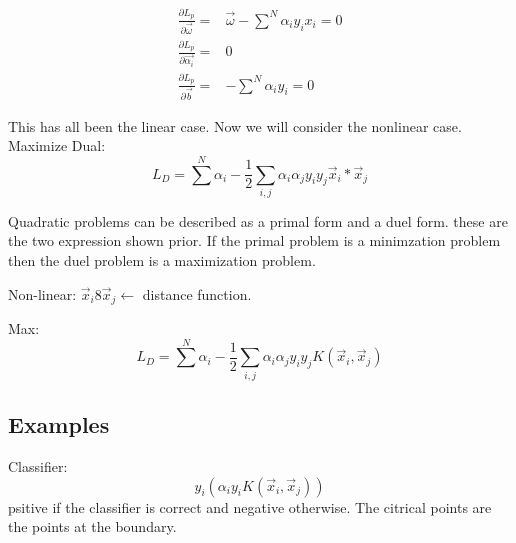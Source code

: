 \documentclass[letterpaper, 9pt]{article}
\begin{document}
\begin{equation}
\begin{split}
\frac{\partial L_p}{\partial \vec{\omega}} =& \vec{\omega} - \sum^N \alpha_i y_i x_i = 0 \\
\frac{\partial L_p}{\partial \vec{\alpha_i}} =& 0 \\
\frac{\partial L_p}{\partial \vec{b}} =& -\sum^N \alpha_i y_i = 0
\end{split}
\end{equation}

This has all been the linear case. Now we will consider the nonlinear case.
Maximize Dual:
\begin{equation}
L_D = \sum^N \alpha_i - \frac{1}{2} \sum_{i,j} \alpha_i \alpha_j y_i y_j \vec{x}_i * \vec{x}_j
\end{equation}

Quadratic problems can be described as a primal form and a duel form. these are the two expression shown prior. If the primal problem is a minimzation problem then the duel problem is a maximization problem.

Non-linear: $\vec{x}_i 8 \vec{x}_j \leftarrow$ distance function. 

Max:
\begin{equation}
L_D = \sum^N \alpha_i - \frac{1}{2} \sum_{i,j} \alpha_i \alpha_j y_i y_j K(\vec{x}_i,\vec{x}_j)
\end{equation}

\subsection{Examples}
Classifier:
\begin{equation}
y_i \left ( \alpha_i y_i K(\vec{x}_i, \vec{x}_j) \right )
\end{equation}
psitive if the classifier is correct and negative otherwise. The citrical points are the points at the boundary.
\end{document}
